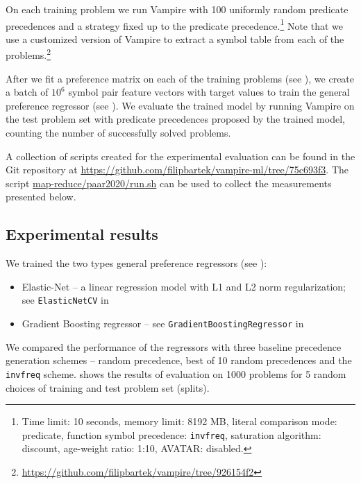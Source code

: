 On each training problem we run %
Vampire with 100 uniformly random predicate precedences
and a strategy fixed up to the predicate precedence.\footnote{Time limit: 10 seconds, memory limit: 8192 MB, literal comparison mode: predicate, function symbol precedence: \texttt{invfreq}, saturation algorithm: discount, age-weight ratio: 1:10, AVATAR: disabled.}
Note that we use a customized version of Vampire to extract a symbol table from each of the problems.\footnote{\url{https://github.com/filipbartek/vampire/tree/926154f2}}

After we fit a preference matrix on each of the training problems (see ),
we create a batch of \(10^6\) symbol pair feature vectors with target values
to train the general preference regressor (see ).
We evaluate the trained model by running Vampire on the test problem set with predicate precedences
proposed by the trained model,
counting the number of successfully solved problems.

A collection of scripts created for the experimental evaluation can be found in the Git repository at
\url{https://github.com/filipbartek/vampire-ml/tree/75c693f3}.
The script
\href{https://github.com/filipbartek/vampire-ml/blob/75c693f3/map-reduce/paar2020/run.sh}{map-reduce/paar2020/run.sh}
can be used to collect the measurements presented below.

\subsection{Experimental results}

We trained the two types general preference regressors (see ):
\begin{itemize}
	\item Elastic-Net -- a linear regression model with L1 and L2 norm regularization; \\
	see \texttt{ElasticNetCV} in \citet{scikit-learn}
	\item Gradient Boosting regressor -- see \texttt{GradientBoostingRegressor} in \citet{scikit-learn}
\end{itemize}

We compared the performance of the regressors
with three baseline precedence generation schemes -- random precedence, best of 10 random precedences
and the \texttt{invfreq} scheme.
 shows the results of evaluation on 1000 problems
for 5 random choices of training and test problem set (splits).

